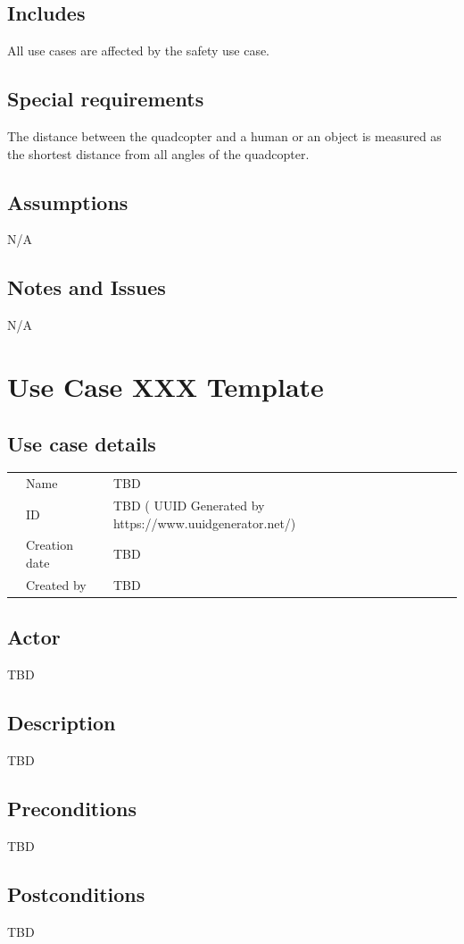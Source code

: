 \documentclass[a4paper]{article}
\begin{document}
\subsection{Includes}
All use cases are affected by the safety use case.
\subsection{Special requirements}
The distance between the quadcopter and a human or an object is measured as the shortest distance from all angles of the quadcopter.
\subsection{Assumptions}
N/A
\subsection{Notes and Issues}
N/A

\section{Use Case XXX Template}
\subsection{Use case details}

\begin{tabular}{lll}
	&Name  & TBD \\
	&ID  & TBD ( UUID Generated by https://www.uuidgenerator.net/) \\
	&Creation date  & TBD \\
	&Created by  & TBD 
\end{tabular}

\subsection{Actor}
TBD
\subsection{Description}
TBD
\subsection{Preconditions}
TBD
\subsection{Postconditions}
TBD
\end{document}
